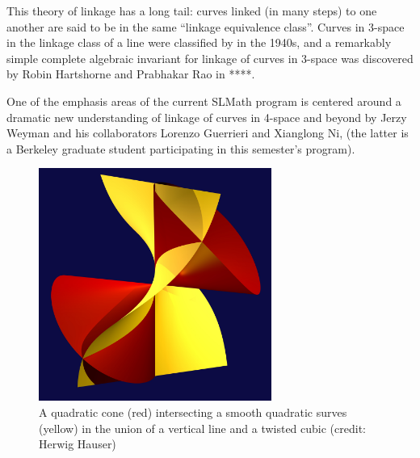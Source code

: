 \documentclass[11pt, oneside]{article}   	%
\begin{document}
This theory of linkage has a long tail: curves linked (in many steps) to one another are said to be in the same ``linkage equivalence class''. Curves in 3-space in the linkage class of a line were classified by in the 1940s, and a remarkably simple complete algebraic invariant for linkage of curves in 3-space was discovered by Robin Hartshorne and Prabhakar Rao in ****. 

One of the emphasis areas of the current SLMath program is centered around a dramatic new understanding of linkage of curves in 4-space and beyond by Jerzy Weyman and his collaborators
Lorenzo Guerrieri and Xianglong Ni, (the latter is a Berkeley graduate student participating in this semester's program).




\begin{figure}\label{cubicAndLine}
\centerline {\includegraphics[height=3in]{"main/Fig15-1-TwistAndShout"}}
 \caption{A quadratic cone (red) intersecting a smooth quadratic surves (yellow) in the union of a vertical line and a twisted cubic (credit: Herwig Hauser)}
\end{figure}

\end{document}

